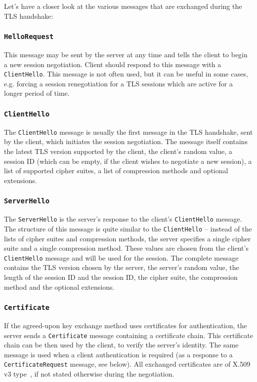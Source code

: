     Let's have a closer look at the various messages that are exchanged during
    the TLS handshake:

\subsubsection{\texttt{HelloRequest}} \label{ref:session-renegotiation}
    This message may be sent by the server at any time and tells the client
    to begin a new session negotiation. Client should respond to this
    message with a \texttt{ClientHello}. This message is not often used, but
    it can be useful in some cases, e.g. forcing a session renegotiation for
    a TLS sessions which are active for a longer period of time.

\subsubsection{\texttt{ClientHello}} \label{ref:client_hello}
    The \texttt{ClientHello} message is usually the first message in the TLS
    handshake, sent by the client, which initiates the session negotiation.
    The message itself contains the latest TLS version supported by the client,
    the client's random value, a session ID (which can be empty, if the client
    wishes to negotiate a new session), a list of supported cipher suites,
    a list of compression methods and optional extensions.

\subsubsection{\texttt{ServerHello}}
    The \texttt{ServerHello} is the server's response to the client's
    \texttt{ClientHello} message. The structure of this message is quite similar
    to the \texttt{ClientHello} -- instead of the lists of cipher suites and
    compression methods, the server specifies a single cipher suite and a single
    compression method. These values are chosen from the client's \texttt{ClientHello}
    message and will be used for the session. The complete message contains
    the TLS version chosen by the server, the server's random value, the length
    of the session ID and the session ID, the cipher suite, the compression
    method and the optional extensions.

\subsubsection{\texttt{Certificate}}
    If the agreed-upon key exchange method uses certificates for authentication,
    the server sends a \texttt{Certificate} message containing a
    certificate chain. This certificate chain can be then used by the client,
    to verify the server's identity. The same message is used when a client
    authentication is required (as a response to a \texttt{CertificateRequest}
    message, see below). All exchanged certificates are of X.509 v3
    type~\cite{rfc5280}, if not stated otherwise during the negotiation.

